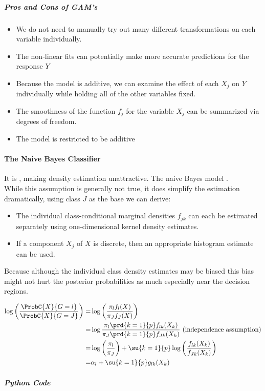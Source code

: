 \subparagraph{Pros and Cons of GAM's}
\begin{itemize}
	\item[\tV{+}] We do not need to manually try out many different
		transformations on each variable individually.
	\item[\tV{+}] The non-linear fits can potentially make more
		accurate predictions for the response $Y$
	\item[\tV{+}] Because the model is additive, we can examine the
		effect of each $X_{j}$ on $Y$ individually while 
		holding all of the other variables fixed.
		
	\item[\tV{+}] The smoothness of the function $f_{j}$ for the 
		variable $X_{j}$ can be summarized via degrees of 
		freedom.
	\item[\tR{-}] The model is restricted to be additive
\end{itemize}

\paragraph{The Naive Bayes Classifier}
It is , making density 
estimation unattractive. The naive Bayes model .\\
While this assumption is generally not true, it does simplify the estimation dramatically, using
class $J$ as the base we can derive:
\begin{itemize}
	\item The individual class-conditional marginal densities $f_{jk}$ can each be estimated
		separately using one-dimensional kernel density estimates.
	\item If a component $X_{j}$ of $X$ is discrete, then an appropriate histogram estimate
		can be used.
\end{itemize}

 Because although the individual class density estimates may be biased
this bias might not hurt the posterior probabilities as much especially near the decision regions.

\begin{align*}
	\log\left(\dfrac{\ProbC{X}{G=l}}{\ProbC{X}{G=J}}\right) =& \log\left(\dfrac{\pi_{l}f_{l}(
	X)}{\pi_{J}f_{J}(X)}\right)\\
	=& \log\dfrac{\pi_{l}\prd{{k=1}}{p}f_{lk}(X_{k})}{\pi_{J}\prd{{k=1}}{p}f_{Jk}(X_{k})}
	\text{ (independence assumption)}\\
	=& \log\left(\dfrac{\pi_{l}}{\pi_{J}}\right) + \su{{k=1}}{p}\log\left(\dfrac{f_{lk}(X_{k})}{f_{Jk}(X_{k})}\right)\\
	=& \alpha_{l} + \su{{k=1}}{p}g_{lk}(X_{k})
\end{align*}
\subparagraph{Python Code}

